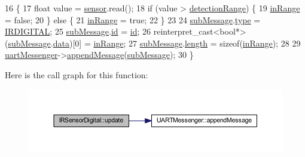 \begin{DoxyCode}
16                              \{
17     \textcolor{keywordtype}{float} value = \hyperlink{class_i_r_sensor_digital_a8b0c7fe2d6e9f575d589342648868235}{sensor}.read();
18     \textcolor{keywordflow}{if} (value > \hyperlink{class_i_r_sensor_digital_abb7c9c63c4aa193dd828d0ee56850478}{detectionRange}) \{
19         \hyperlink{class_i_r_sensor_digital_abeaf8c370c70ac755170a77c92788c57}{inRange} = \textcolor{keyword}{false};
20     \} \textcolor{keywordflow}{else} \{
21         \hyperlink{class_i_r_sensor_digital_abeaf8c370c70ac755170a77c92788c57}{inRange} = \textcolor{keyword}{true};
22     \}
23 
24     \hyperlink{class_i_r_sensor_digital_a930d64f72308a44d9be143d1eb8c77a1}{subMessage}.\hyperlink{struct_sub_message_a064f1d26d553da776dc749d37a18a499}{type} = \hyperlink{_sub_message_8h_a81f78fc173dedefe5a049c0aa3eed2c0aaee95c16a1b18903d850fbab47d73b9d}{IRDIGITAL};
25     \hyperlink{class_i_r_sensor_digital_a930d64f72308a44d9be143d1eb8c77a1}{subMessage}.\hyperlink{struct_sub_message_af3acc450c0686d7a9d15ccd9d548cb6d}{id} = \hyperlink{class_abstract_component_a9c9c548149681b1a1dd935e66ed5dd11}{id};
26     \textcolor{keyword}{reinterpret\_cast<}\textcolor{keywordtype}{bool}*\textcolor{keyword}{>}(\hyperlink{class_i_r_sensor_digital_a930d64f72308a44d9be143d1eb8c77a1}{subMessage}.\hyperlink{struct_sub_message_a7d923c5cdaa380c27d7c4cf60ea7c1be}{data})[0] = \hyperlink{class_i_r_sensor_digital_abeaf8c370c70ac755170a77c92788c57}{inRange};
27     \hyperlink{class_i_r_sensor_digital_a930d64f72308a44d9be143d1eb8c77a1}{subMessage}.\hyperlink{struct_sub_message_a276e06f5335ca7857c21ac8c0e51bd6d}{length} = \textcolor{keyword}{sizeof}(\hyperlink{class_i_r_sensor_digital_abeaf8c370c70ac755170a77c92788c57}{inRange});
28 
29     \hyperlink{class_i_r_sensor_digital_a4890a7142a916a4d1ef70d7ebbe79f77}{uartMessenger}->\hyperlink{class_u_a_r_t_messenger_ada0967869e320c236a211b405abf128a}{appendMessage}(\hyperlink{class_i_r_sensor_digital_a930d64f72308a44d9be143d1eb8c77a1}{subMessage});
30 \}
\end{DoxyCode}
Here is the call graph for this function\+:\nopagebreak
\begin{figure}[H]
\begin{center}
\leavevmode
\includegraphics[width=350pt]{class_i_r_sensor_digital_a8d09a546a1f4b4c6533c324d98a146a9_cgraph}
\end{center}
\end{figure}


